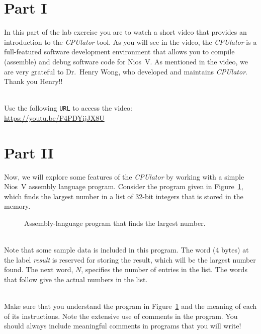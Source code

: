 \documentclass[epsfig,10pt,fullpage]{article}
\begin{document}
\section*{Part I}

In this part of the lab exercise you are to watch a short video that provides an introduction to 
the {\it CPUlator} tool. As you will see in the video, the {\it CPUlator} is a 
full-featured software development environment that allows you to compile (assemble) and debug
software code for Nios~V. As mentioned in the video, we are very grateful to
Dr.~Henry Wong, who developed and maintains {\it CPUlator}. Thank you Henry!!

~\\
Use the following \texttt{URL} to access the video:
~\\

\noindent
\url{https://youtu.be/F4PDYijJX8U}

\section*{Part II}

Now, we will explore some features of the {\it CPUlator} by working with a
simple Nios~V assembly language program. 
Consider the program given in Figure~\ref{fig:code}, which finds the largest number in a list
of 32-bit integers that is stored in the memory.

\begin{figure}[h]
\begin{center}

\end{center}
\caption{Assembly-language program that finds the largest number.}
\label{fig:code}
\end{figure}

~\\
\noindent
Note that some sample data is included in this program.
The word (4 bytes) at the label {\it result} is reserved for storing the result, which will be 
the largest number found. The next word, $N$, specifies the number of entries in the list.
The words that follow give the actual numbers in the list.

~\\
\noindent
Make sure that you understand the program in Figure~\ref{fig:code} and the meaning of each 
of its instructions. Note the extensive use of comments in the program.
You should always include meaningful comments in programs that you will write!
\end{document}
